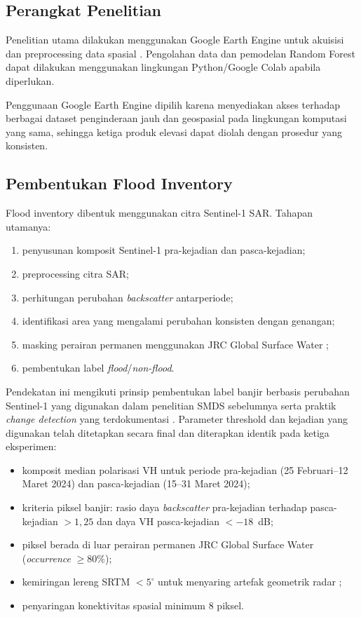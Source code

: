 \documentclass[12pt]{article}
\begin{document}
\subsection{Perangkat Penelitian}

Penelitian utama dilakukan menggunakan Google Earth Engine untuk akuisisi
dan preprocessing data spasial \cite{gorelick2017}. Pengolahan data dan
pemodelan Random Forest dapat dilakukan menggunakan lingkungan
Python/Google Colab apabila diperlukan.

Penggunaan Google Earth Engine dipilih karena menyediakan akses terhadap
berbagai dataset penginderaan jauh dan geospasial pada lingkungan komputasi
yang sama, sehingga ketiga produk elevasi dapat diolah dengan prosedur yang
konsisten.

\subsection{Pembentukan Flood Inventory}

Flood inventory dibentuk menggunakan citra Sentinel-1 SAR. Tahapan utamanya:

\begin{enumerate}
\item penyusunan komposit Sentinel-1 pra-kejadian dan pasca-kejadian;
\item preprocessing citra SAR;
\item perhitungan perubahan \textit{backscatter} antarperiode;
\item identifikasi area yang mengalami perubahan konsisten dengan genangan;
\item masking perairan permanen menggunakan JRC Global Surface Water
\cite{pekel2016};
\item pembentukan label \textit{flood}/\textit{non-flood}.
\end{enumerate}

Pendekatan ini mengikuti prinsip pembentukan label banjir berbasis perubahan
Sentinel-1 yang digunakan dalam penelitian SMDS sebelumnya \cite{hakim2026}
serta praktik \textit{change detection} yang terdokumentasi
\cite{islammeng2022,unspider2024}. Parameter threshold dan kejadian yang
digunakan telah ditetapkan secara final dan diterapkan identik pada ketiga
eksperimen:

\begin{itemize}
\item komposit median polarisasi VH untuk periode pra-kejadian
(25 Februari--12 Maret 2024) dan pasca-kejadian (15--31 Maret 2024);
\item kriteria piksel banjir: rasio daya \textit{backscatter} pra-kejadian
terhadap pasca-kejadian $>1{,}25$ dan daya VH pasca-kejadian $<-18$~dB;
\item piksel berada di luar perairan permanen JRC Global Surface Water
(\textit{occurrence} $\geq 80\%$);
\item kemiringan lereng SRTM $<5^{\circ}$ untuk menyaring artefak geometrik
radar \cite{hakim2026};
\item penyaringan konektivitas spasial minimum 8 piksel.
\end{itemize}
\end{document}
